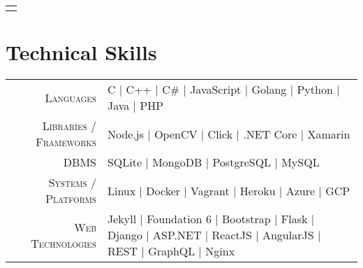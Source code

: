 \documentclass[a4paper,10pt]{extarticle} %
\begin{document}
\begin{tabular}{p{19.7cm}}
\begin{description}[style=nextline, font=$\bullet$\hspace{2mm}\normalsize]


\end{description}
\end{tabular}

\vspace{-0.6cm}
\section{\textcolor{primary}{Technical Skills}}

\begin{tabular}{r|p{15cm}}
\textsc{Languages} & C | C++ | C\# | JavaScript | Golang | Python | Java | PHP \\
\textsc{Libraries / Frameworks} & Node.js | OpenCV | Click | .NET Core | Xamarin \\
\textsc{DBMS} & SQLite | MongoDB | PostgreSQL | MySQL \\
\textsc{Systems / Platforms} & Linux | Docker | Vagrant | Heroku | Azure | GCP \\
\textsc{Web Technologies} & Jekyll | Foundation 6 | Bootstrap | Flask | Django | ASP.NET | ReactJS | AngularJS | REST | GraphQL | Nginx \\
\end{tabular}
\end{document}
